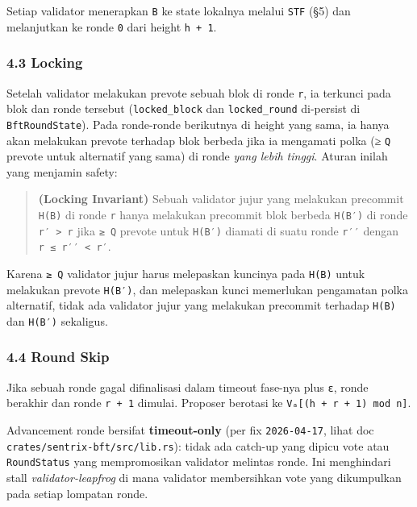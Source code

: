 \documentclass[11pt,a4paper]{article}
\begin{document}
Setiap validator menerapkan \texttt{B} ke state lokalnya melalui \texttt{STF} (§5) dan melanjutkan ke ronde \texttt{0} dari height \texttt{h\ +\ 1}.

\hypertarget{locking}{%
\subsubsection{4.3 Locking}\label{locking}}

Setelah validator melakukan prevote sebuah blok di ronde \texttt{r}, ia terkunci pada blok dan ronde tersebut (\texttt{locked\_block} dan \texttt{locked\_round} di-persist di \texttt{BftRoundState}). Pada ronde-ronde berikutnya di height yang sama, ia hanya akan melakukan prevote terhadap blok berbeda jika ia mengamati polka (≥ \texttt{Q} prevote untuk alternatif yang sama) di ronde \emph{yang lebih tinggi}. Aturan inilah yang menjamin safety:

\begin{quote}
\textbf{(Locking Invariant)} Sebuah validator jujur yang melakukan precommit \texttt{H(B)} di ronde \texttt{r} hanya melakukan precommit blok berbeda \texttt{H(B′)} di ronde \texttt{r′\ \textgreater{}\ r} jika \texttt{≥\ Q} prevote untuk \texttt{H(B′)} diamati di suatu ronde \texttt{r′′} dengan \texttt{r\ ≤\ r′′\ \textless{}\ r′}.
\end{quote}

Karena \texttt{≥\ Q} validator jujur harus melepaskan kuncinya pada \texttt{H(B)} untuk melakukan prevote \texttt{H(B′)}, dan melepaskan kunci memerlukan pengamatan polka alternatif, tidak ada validator jujur yang melakukan precommit terhadap \texttt{H(B)} dan \texttt{H(B′)} sekaligus.

\hypertarget{round-skip}{%
\subsubsection{4.4 Round Skip}\label{round-skip}}

Jika sebuah ronde gagal difinalisasi dalam timeout fase-nya plus \texttt{ε}, ronde berakhir dan ronde \texttt{r\ +\ 1} dimulai. Proposer berotasi ke \texttt{Vₐ{[}(h\ +\ r\ +\ 1)\ mod\ n{]}}.

Advancement ronde bersifat \textbf{timeout-only} (per fix \texttt{2026-04-17}, lihat doc \texttt{crates/sentrix-bft/src/lib.rs}): tidak ada catch-up yang dipicu vote atau \texttt{RoundStatus} yang mempromosikan validator melintas ronde. Ini menghindari stall \emph{validator-leapfrog} di mana validator membersihkan vote yang dikumpulkan pada setiap lompatan ronde.
\end{document}
